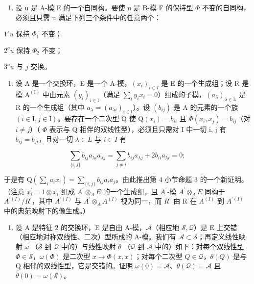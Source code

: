 \begin{enumerate}
\def\labelenumi{\alph{enumi})}
\setcounter{enumi}{3}
\tightlist
\item
  设 u 是 A-模 E 的一个自同构。要使 u 是 B-模 F 的保持型 \(\Phi\) 不变的自同构，必须且只需 u 满足下列三个条件中的任意两个：
\end{enumerate}

\(1^{\circ} u\) 保持 \(\Phi_{1}\) 不变；

\(2^{o} u\) 保持 \(\Phi_{2}\) 不变；

\(3^{o} u\) 与 \(j\) 交换。

\begin{enumerate}
\def\labelenumi{\arabic{enumi})}
\setcounter{enumi}{4}
\tightlist
\item
  设 A 是一个交换环，E 是一个 A-模，\((x_{i})_{i\in I}\) 是 E 的一个生成组；设 R 是模 \(\mathrm{A}^{(\mathrm{I})}\) 中由元素 \((y_{i})_{i\in\mathrm{I}}\)（满足 \(\sum_{i}y_{i}x_{i}=0\)）组成的子模，\((a_{\lambda})_{\lambda\in\mathrm{L}}\) 是 R 的一个生成组（其中 \(a_{\lambda}=(a_{\lambda i})_{i\in\mathrm{I}}\)）。设 \((b_{ij})\) 是 A 的元素的一个族 \((i\in\mathrm{I},j\in\mathrm{I})\)。要存在一个二次型 Q 使 \(\mathrm{Q}(x_{i})=b_{ii}\) 且 \(\Phi(x_{i},x_{j})=b_{ij}\)（对 \(i\neq j\)）（ \(\Phi\) 表示与 Q 相伴的双线性型），必须且只需对 I 中一切 i, j 有 \(b_{ij}=b_{ji}\)，且对一切 \(\lambda\in L\) 与 \(i\in I\) 有
\end{enumerate}

\[
\sum_ {\{i, j \}} b _ {i j} a _ {\lambda i} a _ {\lambda j} = \sum_ {j \neq i} b _ {i j} a _ {\lambda j} + 2 b _ {i i} a _ {\lambda i} = 0;\tag{3}
\]

于是有 \(\mathrm{Q}(\sum_{i}a_{i}x_{i})=\sum_{\{i,j\}}b_{ij}a_{i}a_{j}\)。由此推出第 4 小节命题 3 的一个新证明。（注意 \(x_{i}^{\prime}=1\otimes x_{i}\) 组成 \(A^{\prime}\otimes_{A}E\) 的一个生成组，且 \(A^{\prime}\)-模 \(A^{\prime}\otimes_{A}E\) 同构于 \(A^{\prime(I)}/R^{\prime}\)，其中 \(A^{\prime(I)}\) 与 \(A^{\prime}\otimes_{A}A^{(I)}\) 视为同一，而 \(R^{\prime}\) 由 R 在 \(A^{(I)}\) 到 \(A^{\prime(I)}\) 中的典范映射下的像生成。）

\begin{enumerate}
\def\labelenumi{\arabic{enumi})}
\setcounter{enumi}{5}
\tightlist
\item
  设 A 是特征 2 的交换环，E 是自由 A-模，\(\mathcal{A}\)（相应地 \(\mathcal{S},\mathcal{Q}\)）是 E 上交错（相应地对称双线性、二次）型所成的 A-模。我们有 \(\mathcal{A}\subset\mathcal{S}\)；再定义线性映射 \(\omega\) （\(\mathcal{S}\) 到 \(\mathcal{Q}\) 中的）与线性映射 \(\theta\) （\(\mathcal{Q}\) 到 \(\mathcal{A}\) 中的）如下：对每个双线性型 \(\Phi\in\mathcal{S}\)，\(\omega(\Phi)\) 是二次型 \(x\to\Phi(x,x)\)；对每个二次型 \(Q\in\mathcal{Q}\)，\(\theta(Q)\) 是与 Q 相伴的双线性型，它是交错的。证明 \(\omega(0)=\mathcal{A}\)、\(\theta(\mathcal{Q})=\mathcal{A}\) 且 \(\bar{\theta}(0)=\omega(\mathcal{S})\)。
\end{enumerate}

